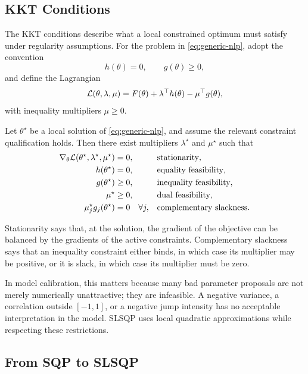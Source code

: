 \subsection{KKT Conditions}

The KKT conditions describe what a local constrained optimum must satisfy under regularity assumptions. For the problem in \eqref{eq:generic-nlp}, adopt the convention
\[
    h(\theta)=0,\qquad g(\theta)\geq0,
\]
and define the Lagrangian
\begin{equation}
    \mathcal{L}(\theta,\lambda,\mu)
    =
    F(\theta)
    + \lambda^\top h(\theta)
    - \mu^\top g(\theta),
\end{equation}
with inequality multipliers \(\mu\geq0\).

\begin{theorem}
Let \(\theta^\star\) be a local solution of \eqref{eq:generic-nlp}, and assume the relevant constraint qualification holds. Then there exist multipliers \(\lambda^\star\) and \(\mu^\star\) such that
\begin{align}
    \nabla_\theta \mathcal{L}(\theta^\star,\lambda^\star,\mu^\star) &= 0,
    &&\text{stationarity}, \\
    h(\theta^\star) &= 0,
    &&\text{equality feasibility}, \\
    g(\theta^\star) &\geq 0,
    &&\text{inequality feasibility}, \\
    \mu^\star &\geq 0,
    &&\text{dual feasibility}, \\
    \mu_j^\star g_j(\theta^\star) &= 0\quad\forall j,
    &&\text{complementary slackness}. 
\end{align}
\end{theorem}

Stationarity says that, at the solution, the gradient of the objective can be balanced by the gradients of the active constraints. Complementary slackness says that an inequality constraint either binds, in which case its multiplier may be positive, or it is slack, in which case its multiplier must be zero.

In model calibration, this matters because many bad parameter proposals are not merely numerically unattractive; they are infeasible. A negative variance, a correlation outside \([-1,1]\), or a negative jump intensity has no acceptable interpretation in the model. SLSQP uses local quadratic approximations while respecting these restrictions.
\subsection{From SQP to SLSQP}

